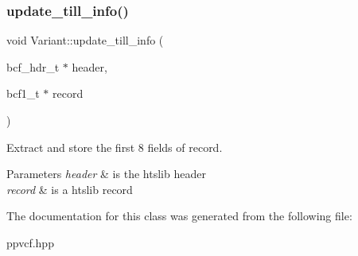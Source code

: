 \subsubsection{\texorpdfstring{update\_till\_info()}{update\_till\_info()}}
{\footnotesize\ttfamily void Variant\+::update\+\_\+till\+\_\+info (\begin{DoxyParamCaption}\item[{bcf\+\_\+hdr\+\_\+t $\ast$}]{header,  }\item[{bcf1\+\_\+t $\ast$}]{record }\end{DoxyParamCaption})\hspace{0.3cm}{\ttfamily [inline]}}

Extract and store the first 8 fields of record.


\begin{DoxyParams}{Parameters}
{\em header} & is the htslib header \\
\hline
{\em record} & is a htslib record \\
\hline
\end{DoxyParams}


The documentation for this class was generated from the following file\+:\begin{DoxyCompactItemize}
\item 
ppvcf.\+hpp\end{DoxyCompactItemize}

